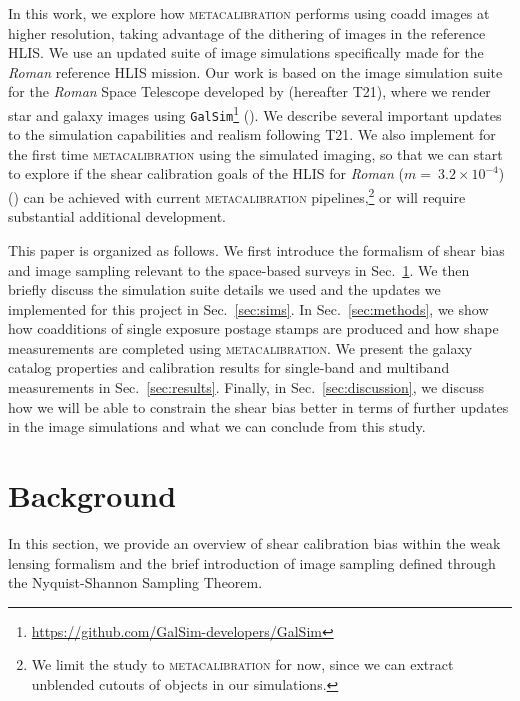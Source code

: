 \documentclass[fleqn,usenatbib]{mnras}
\begin{document}
In this work, we explore how \textsc{metacalibration} performs using coadd images at higher resolution, taking advantage of the dithering of images in the reference HLIS. We use an updated suite of image simulations specifically made for the \emph{Roman} reference HLIS mission. Our work is based on the image simulation suite for the \emph{Roman} Space Telescope developed by \cite{2021MNRAS.501.2044T} (hereafter T21), where we render star and galaxy images using \texttt{GalSim}\footnote{\url{ https://github.com/GalSim-developers/GalSim}} (\citealt{2015A&C....10..121R}). We describe several important updates to the simulation capabilities and realism following T21. We also implement for the first time \textsc{metacalibration} using the simulated imaging, so that we can start to explore if the shear calibration goals of the HLIS for \emph{Roman} ($m=~3.2\times10^{-4}$) (\citealt{2018arXiv180403628D}) can be achieved with current \textsc{metacalibration} pipelines,\footnote{We limit the study to \textsc{metacalibration} for now, since we can extract unblended cutouts of objects in our simulations.} or will require substantial additional development. \par


This paper is organized as follows. We first introduce the formalism of shear bias and image sampling relevant to the space-based surveys in Sec.~\ref{sec:background}. We then briefly discuss the simulation suite details we used and the updates we implemented for this project in Sec.~\ref{sec:sims}. In Sec.~\ref{sec:methods}, we show how coadditions of single exposure postage stamps are produced and how shape measurements are completed using \textsc{metacalibration}. We present the galaxy catalog properties and calibration results for single-band and multiband measurements in Sec.~\ref{sec:results}. Finally, in Sec.~\ref{sec:discussion}, we discuss how we will be able to constrain the shear bias better in terms of further updates in the image simulations and what we can conclude from this study. 

\section{Background}
\label{sec:background}
In this section, we provide an overview of shear calibration bias within the weak lensing formalism and the brief introduction of image sampling defined through the Nyquist-Shannon Sampling Theorem.
\end{document}
